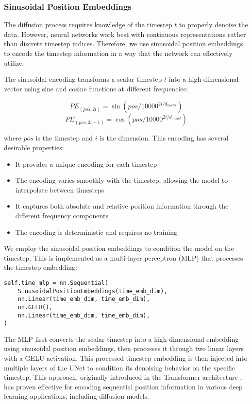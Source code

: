 \subsubsection{Sinusoidal Position Embeddings}

The diffusion process requires knowledge of the timestep $t$ to properly denoise the data. However, neural networks work best with continuous representations rather than discrete timestep indices. Therefore, we use sinusoidal position embeddings to encode the timestep information in a way that the network can effectively utilize.

The sinusoidal encoding transforms a scalar timestep $t$ into a high-dimensional vector using sine and cosine functions at different frequencies:

\begin{equation}
    PE_{(pos,2i)} = \sin(pos/10000^{2i/d_{model}})
\end{equation}
\begin{equation}
    PE_{(pos,2i+1)} = \cos(pos/10000^{2i/d_{model}})
\end{equation}

\noindent where $pos$ is the timestep and $i$ is the dimension. This encoding has several desirable properties:

\begin{itemize}
    \item It provides a unique encoding for each timestep
    \item The encoding varies smoothly with the timestep, allowing the model to interpolate between timesteps
    \item It captures both absolute and relative position information through the different frequency components
    \item The encoding is deterministic and requires no training
\end{itemize}


\noindent We employ the sinusoidal position embeddings to condition the model on the timestep. This is implemented as a multi-layer perceptron (MLP) that processes the timestep embedding:

\begin{lstlisting}[basicstyle=\tiny]
self.time_mlp = nn.Sequential(
    SinusoidalPositionEmbeddings(time_emb_dim),
    nn.Linear(time_emb_dim, time_emb_dim),
    nn.GELU(),
    nn.Linear(time_emb_dim, time_emb_dim),
)
\end{lstlisting}

\noindent The MLP first converts the scalar timestep into a high-dimensional embedding using sinusoidal position embeddings, then processes it through two linear layers with a GELU activation. This processed timestep embedding is then injected into multiple layers of the UNet to condition its denoising behavior on the specific timestep. This approach, originally introduced in the Transformer architecture \cite{vaswani2017attention}, has proven effective for encoding sequential position information in various deep learning applications, including diffusion models.


